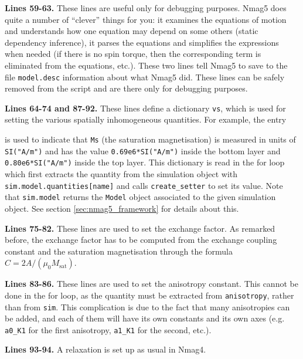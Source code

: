 \documentclass[11pt,oneside,openany]{article}
\newcommand{\Ms}{M_{\mathrm{sat}}}
\begin{document}
\textbf{Lines 59-63.} These lines are useful only for debugging purposes.
Nmag5 does quite a number of ``clever'' things for you: it examines
the equations of motion and understands how one equation may depend on
some others (static dependency inference), it parses the equations
and simplifies the expressions when needed (if there is no spin torque, then
the corresponding term is eliminated from the equations, etc.).
These two lines tell Nmag5 to save to the file \verb|model.desc| information
about what Nmag5 did. These lines can be safely removed from the script
and are there only for debugging purposes.

\textbf{Lines 64-74 and 87-92.} These lines define a dictionary \verb|vs|,
which is used for setting the various spatially inhomogeneous quantities. For
example, the entry

 is used to indicate
that \verb|Ms| (the saturation magnetisation) is measured in units of
\verb|SI("A/m")| and has the value \verb|0.69e6*SI("A/m")| inside the bottom
layer and \verb|0.80e6*SI("A/m")| inside the top layer. This dictionary is
read in the for loop which first extracts the quantity from the
simulation object with \verb|sim.model.quantities[name]| and calls
\verb|create_setter| to set its value. Note that \verb|sim.model| returns
the \verb|Model| object associated to the given simulation object.
See section \ref{sec:nmag5_framework} for details about this.

\textbf{Lines 75-82.} These lines are used to set the exchange factor.
As remarked before, the exchange factor has to be computed from the
exchange coupling constant and the saturation magnetisation through
the formula $C = 2A/(\mu_0 \Ms)$.

\textbf{Lines 83-86.} These lines are used to set the anisotropy constant.
This cannot be done in the for loop, as the quantity must be extracted from
\verb|anisotropy|, rather than from \verb|sim|. This complication is due
to the fact that many anisotropies can be added, and each of them will have
its own constants and its own axes (e.g. \verb|a0_K1| for the first
anisotropy, \verb|a1_K1| for the second, etc.).

\textbf{Lines 93-94.} A relaxation is set up as usual in Nmag4.
\end{document}
